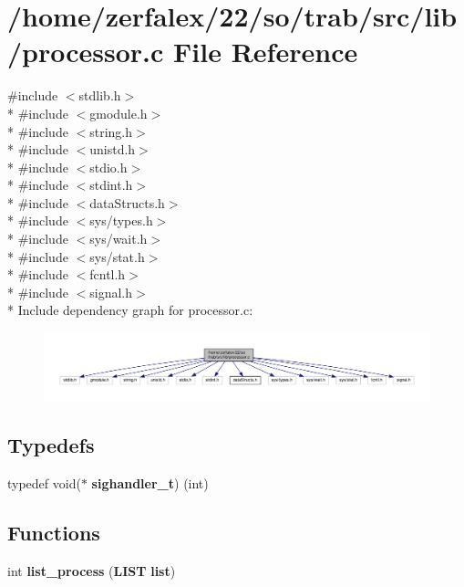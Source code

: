 \section{/home/zerfalex/22/so/trab/src/lib/processor.c File Reference}
\label{processor_8c}
{\ttfamily \#include $<$stdlib.\+h$>$}\\*
{\ttfamily \#include $<$gmodule.\+h$>$}\\*
{\ttfamily \#include $<$string.\+h$>$}\\*
{\ttfamily \#include $<$unistd.\+h$>$}\\*
{\ttfamily \#include $<$stdio.\+h$>$}\\*
{\ttfamily \#include $<$stdint.\+h$>$}\\*
{\ttfamily \#include $<$data\+Structs.\+h$>$}\\*
{\ttfamily \#include $<$sys/types.\+h$>$}\\*
{\ttfamily \#include $<$sys/wait.\+h$>$}\\*
{\ttfamily \#include $<$sys/stat.\+h$>$}\\*
{\ttfamily \#include $<$fcntl.\+h$>$}\\*
{\ttfamily \#include $<$signal.\+h$>$}\\*
Include dependency graph for processor.\+c\+:\nopagebreak
\begin{figure}[H]
\begin{center}
\leavevmode
\includegraphics[width=350pt]{processor_8c__incl}
\end{center}
\end{figure}
\subsection*{Typedefs}
\begin{DoxyCompactItemize}
\item 
typedef void($\ast$ {\bf sighandler\+\_\+t}) (int)
\end{DoxyCompactItemize}
\subsection*{Functions}
\begin{DoxyCompactItemize}
\item 
int {\bf list\+\_\+process} ({\bf L\+I\+ST} {\bf list})
\end{DoxyCompactItemize}


